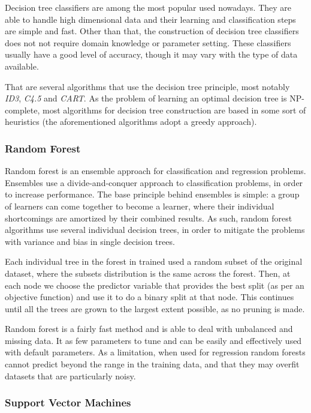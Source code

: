 Decision tree classifiers are among the most popular used nowadays. They are
able to handle high dimensional data and their learning and classification steps
are simple and fast. Other than that, the construction of decision tree
classifiers does not not require domain knowledge or parameter setting. These
classifiers usually have a good level of accuracy, though it may vary with the
type of data available.

That are several algorithms that use the decision tree principle, most notably
\textit{ID3}, \textit{C4.5} and \textit{CART}. As the problem of learning an
optimal decision tree is NP-complete, most algorithms for decision tree
construction are based in some sort of heuristics (the aforementioned algorithms
adopt a greedy approach).

\subsubsection*{Random Forest}

Random forest \cite{breiman2001random} is an ensemble approach for
classification and regression problems. Ensembles use a divide-and-conquer
approach to classification problems, in order to increase performance. The base
principle behind ensembles is simple: a group of  learners can come
together to become a  learner, where their individual shortcomings
are amortized by their combined results. As such, random forest algorithms use
several individual decision trees, in order to mitigate the problems with
variance and bias in single decision trees.

Each individual tree in the forest in trained used a random subset of the
original dataset, where the subsets distribution is the same across the forest.
Then, at each node we choose the predictor variable that provides the best split
(as per an objective function) and use it to do a binary split at that node.
This continues until all the trees are grown to the largest extent possible, as
no pruning is made.

Random forest is a fairly fast method and is able to deal with unbalanced and
missing data. It as few parameters to tune and can be easily and effectively
used with default parameters. As a limitation, when used for regression random
forests cannot predict beyond the range in the training data, and that they may
overfit datasets that are particularly noisy.

\subsubsection*{Support Vector Machines}

